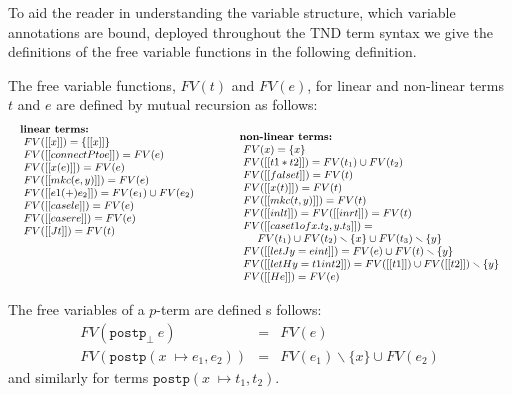 To aid the reader in understanding the variable structure, which
variable annotations are bound, deployed throughout the TND term
syntax we give the definitions of the free variable functions in the
following definition.
\begin{definition}
The free variable functions, $FV(t)$ and $FV(e)$, for linear and
non-linear terms $t$ and $e$ are defined by mutual recursion as
follows:
\[ \small
\begin{array}{lll}  
  \begin{array}{lll}
    \textbf{linear terms:}\\
    \,\,FV([[x]])  = \{ [[x]]\}\\
    \,\,FV([[connectP to e]]) = FV(e) \\ 
    \,\,FV([[x(e)]]) = FV(e)\\
    \,\,FV([[mkc(e,y)]]) = FV(e)\\
    \,\,FV([[e1 (+) e_2]]) = FV(e_1) \cup FV(e_2)\\
    \,\,FV([[casel e]]) = FV(e)\\
    \,\,FV([[caser e]]) = FV(e)\\    
    \,\,FV([[J t]]) = FV(t)\\
    \\
    \\
    \\[13px]
  \end{array}
  & \quad &  
  \begin{array}{lll}
    \textbf{non-linear terms:}\\
    \,\,FV(x) = \{ x\}\\
    \,\,FV([[t1 * t2]])  = FV(t_1)\cup FV(t_2) \\
    \,\,FV([[false t]])  = FV(t) \\
    \,\,FV([[x(t)]]) = FV(t)\\
    \,\,FV([[mkc(t,y)]]) = FV(t)\\
    \,\,FV([[inl t]]) = FV([[inr t]]) = FV(t)\\
    \,\,FV([[case t1 of x.t_2,y.t_3]]) = \\
    \,\,\,\,\,\,\,\,\,\,FV(t_1)\cup FV(t_2)\smallsetminus\{x\}\cup FV(t_3)\smallsetminus \{y\}\\
    \,\,FV([[let J y = e in t]]) = FV(e)\cup FV(t)\smallsetminus \{y\} \\
    \,\,FV([[let H y = t1 in t2]]) = FV([[t1]])\cup FV([[t2]])\smallsetminus \{y\} \\
    \,\,FV([[H e]]) = FV(e)\\
  \end{array}
\end{array}
\]
The free variables of a $p$-term are defined s follows: 
\[
\begin{array}{rll}
  FV(\mathtt{postp}_{\bot}\ e) & = & FV(e)\\
  FV(\mathtt{postp} (x 􏰀\mapsto e_1, e_2)) & = & FV(e_1) \smallsetminus \{x\} \cup FV(e_2)
\end{array}
\] 
and similarly for terms $\mathtt{postp} (x 􏰀\mapsto t_1, t_2)$.
\end{definition}

